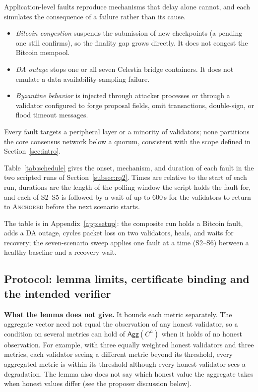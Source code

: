 Application-level faults reproduce mechanisms that delay alone cannot, and
each simulates the consequence of a failure rather than its cause.
\begin{itemize}
  \item \emph{Bitcoin congestion} suspends the submission of new
  checkpoints (a pending one still confirms), so the finality gap grows
  directly. It does not congest the Bitcoin mempool.
  \item \emph{DA outage} stops one or all seven Celestia bridge containers.
  It does not emulate a data-availability-sampling failure.
  \item \emph{Byzantine behavior} is injected through attacker processes or
  through a validator configured to forge proposal fields, omit
  transactions, double-sign, or flood timeout messages.
\end{itemize}
Every fault targets a peripheral layer or a minority of validators; none
partitions the core consensus network below a quorum, consistent with the
scope defined in Section~\ref{sec:intro}.


Table~\ref{tab:schedule} gives the onset, mechanism, and duration of each
fault in the two scripted runs of Section~\ref{subsec:rq2}. Times are
relative to the start of each run, durations are the length of the polling
window the script holds the fault for, and each of S2--S5 is followed by a
wait of up to 600\,s for the validators to return to \textsc{Anchored} before
the next scenario starts.

The table is in Appendix~\ref{app:setup}: the composite run holds a Bitcoin fault, adds a DA outage, cycles packet loss on two validators, heals, and waits for recovery; the seven-scenario sweep applies one fault at a time (S2--S6) between a healthy baseline and a recovery wait.

\subsection*{Protocol: lemma limits, certificate binding and the intended verifier}

\textbf{What the lemma does not give.} It bounds each metric separately. The
aggregate vector need not equal the observation of any honest validator, so a
condition on several metrics can hold of $\mathsf{Agg}(C^{h})$ when it holds of
no honest observation. For example, with three equally weighted honest
validators and three metrics, each validator seeing a different metric beyond
its threshold, every aggregated metric is within its threshold although every
honest validator sees a degradation. The lemma also does not say which honest
value the aggregate takes when honest values differ (see the proposer
discussion below).

